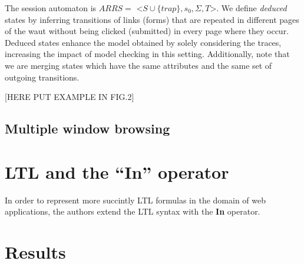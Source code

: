 \documentclass[a4paper,10pt]{article}
\begin{document}
The session automaton is $ARRS =$ <$S \cup \{trap\}, s_0, \Sigma, T$>. We define \emph{deduced} states by inferring transitions of links (forms) that are repeated in different pages of the \gls{waut} without being clicked (submitted) in every page where they occur. Deduced states enhance the model obtained by solely considering the traces, increasing the impact of model checking in this setting. Additionally, note that we are merging states which have the same attributes and the same set of outgoing transitions.

[HERE PUT EXAMPLE IN FIG.2]

\subsection{Multiple window browsing}
\label{multiple-window-browsing}

\section{LTL and the ``In'' operator}
\label{ltl-and-the-in-operator}

In order to represent more succintly LTL formulas in the domain of web
applications, the authors extend the LTL syntax with the \textbf{In}
operator.

\section{Results}
\label{results}

\printbibliography
\end{document}
